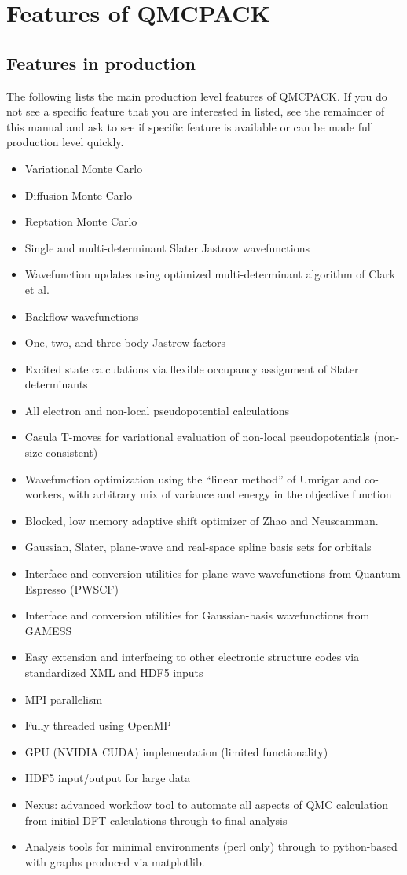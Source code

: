 \chapter{Features of QMCPACK}
\label{chap:features}
\section{Features in production}
The following lists the main production level features of QMCPACK. If
you do not see a specific feature that you are interested in listed,
see the remainder of this manual and ask to see if specific feature is
available or can be made full production level quickly.

\begin{itemize}
\item Variational Monte Carlo
\item Diffusion Monte Carlo
\item Reptation Monte Carlo
\item Single and multi-determinant Slater Jastrow wavefunctions
\item Wavefunction updates using optimized multi-determinant algorithm of Clark et al.
\item Backflow wavefunctions
\item One, two, and three-body Jastrow factors
\item Excited state calculations via flexible occupancy assignment of Slater determinants
\item All electron and non-local pseudopotential calculations
\item Casula T-moves for variational evaluation of non-local
  pseudopotentials (non-size consistent)
\item Wavefunction optimization using the ``linear method'' of Umrigar
  and co-workers, with arbitrary mix of variance and energy in the
  objective function
\item Blocked, low memory adaptive shift optimizer of Zhao and Neuscamman. 
\item Gaussian, Slater, plane-wave and real-space spline basis sets for orbitals
\item Interface and conversion utilities for plane-wave wavefunctions from Quantum Espresso (PWSCF)
\item Interface and conversion utilities for Gaussian-basis wavefunctions from GAMESS
\item Easy extension and interfacing to other electronic structure codes via standardized XML and HDF5 inputs
\item MPI parallelism
\item Fully threaded using OpenMP
\item GPU (NVIDIA CUDA) implementation (limited functionality)
\item HDF5 input/output for large data
\item Nexus: advanced workflow tool to automate all aspects of QMC calculation from initial DFT calculations through to final analysis
\item Analysis tools for minimal environments (perl only) through to python-based with graphs produced via matplotlib.
\end{itemize}


